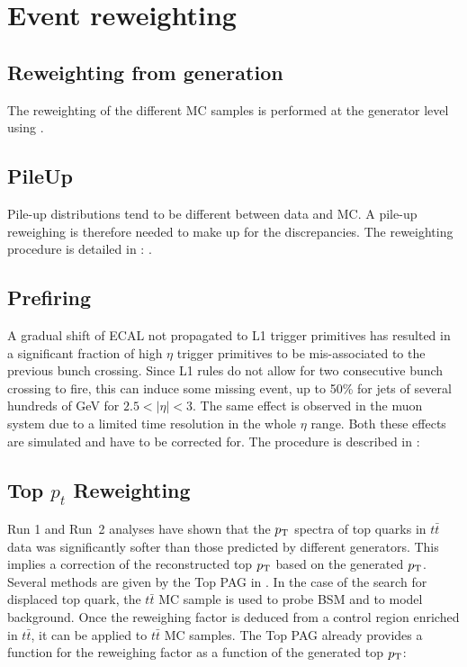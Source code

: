 \documentclass{cernatlasnote}
\newcommand{\pt}{$p_{\text T}$\xspace}
\begin{document}
\newpage

\section{Event reweighting}
    \label{EVENT_W}
    \subsection{Reweighting from generation}
        The reweighting of the different MC samples is performed at the generator level using \cite{LHEReaderCMSSW}.
    \subsection{PileUp}
        Pile-up distributions tend to be different between data and MC. A pile-up reweighing is therefore needed to make up for the discrepancies. The reweighting procedure is detailed in : \cite{PileupMCReweightingUtilities}.
        
    \subsection{Prefiring}
        A gradual shift of ECAL not propagated to L1 trigger primitives has resulted in a significant fraction of high $\eta$ trigger primitives to be mis-associated to the previous bunch crossing. Since L1 rules do not allow for two consecutive bunch crossing to fire, this can induce some missing event, up to 50\% for jets of several hundreds of GeV for $2.5<|\eta|<3$. The same effect is observed in the muon system due to a limited time resolution in the whole $\eta$ range. Both these effects are simulated and have to be corrected for. The procedure is described in : \cite{L1PrefiringWeightRecipe}
    \subsection{Top $p_{t}$ Reweighting}
            
            Run 1 and Run~2 analyses have shown that the \pt spectra of top quarks in $t\bar{t}$ data was significantly softer than those predicted by different generators. This implies a correction of the reconstructed top \pt based  on the generated \pt. Several methods are given by the Top PAG in \cite{TopPtReweighting}. In the case of the search for displaced top quark, the $t\bar{t}$ MC sample is used to probe BSM and to model background. Once the reweighing factor is deduced from a control region enriched in $t\bar{t}$, it can be applied to $t\bar{t}$ MC samples. The Top PAG already provides a function for the reweighing factor as a function of the generated top \pt :
\end{document}
